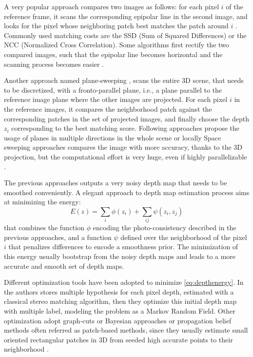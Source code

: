A very popular approach compares two images as follows: for each pixel $i$ of the reference frame, it scans the corresponding epipolar line in the second image, and looks for the pixel whose neighboring patch best matches the patch around $i$  \cite{lhuillier2002match}. 
Commonly used matching costs are the SSD (Sum of Squared Differences) or the NCC (Normalized Cross Correlation).
Some algorithms first rectify the two compared images, such that the epipolar line becomes horizontal and the scanning process becomes easier 
\cite{kang2001handling,bradley2008accurate,moons20093d}. 

Another approach named plane-sweeping \cite{collins1996space}, scans the entire 3D scene, that needs to be discretized, with a fronto-parallel plane, i.e., a plane parallel to the reference image plane where the other images are projected. For each pixel $i$ in the reference images, it compares the neighborhood patch against the corresponding patches in the set of projected images, and finally choose the depth $z_i$ corresponding to the best matching score. 
Following approaches propose the usage of planes in multiple directions in the whole scene \cite{gallup2007real} or locally \cite{sinha2014efficient}
Space sweeping approaches compares the image with more accuracy, thanks to the 3D projection, but the computational effort is very huge, even if highly parallelizable \cite{yang2003multi}.

The previous approaches outputs a very noisy depth map that needs to be smoothed conveniently. 
A elegant approach to depth map estimation process aims at minimizing the energy:
\begin{equation}
 \label{eq:depthenergy} 
 E(z) = \sum_i \phi(z_i)  + \sum_{ij} \psi(z_i,z_j)
\end{equation}
that combines the function $\phi$ encoding the photo-consistency described in the previous approaches, and a function $\psi$ defined over the neighborhood of the pixel $i$ that penalizes differences to encode a smoothness prior. The minimization of this energy usually bootstrap from the noisy depth maps and leads to a more accurate and smooth set of depth maps.

Different optimization tools have been adopted to minimize \eqref{eq:depthenergy}. In \cite{campbell2008using} the authors stores multiple hypothesis for each pixel depth, estimated with a classical stereo matching algorithm, then they optimize this initial depth map with multiple label, modeling the problem as a Markov Random Field. Other optimization adopt graph-cuts \cite{kolmogorov2002multi} or Bayesian approaches \cite{strecha2006combined,gargallo2005bayesian} or propagation belief methods often referred as patch-based methods, since they usually estimate small oriented rectangular patches in 3D from seeded high accurate points to their neighborhood \cite{fu10,goesele2007multi,Tola12,bleyer2011patchmatch,heise2013pm}.





